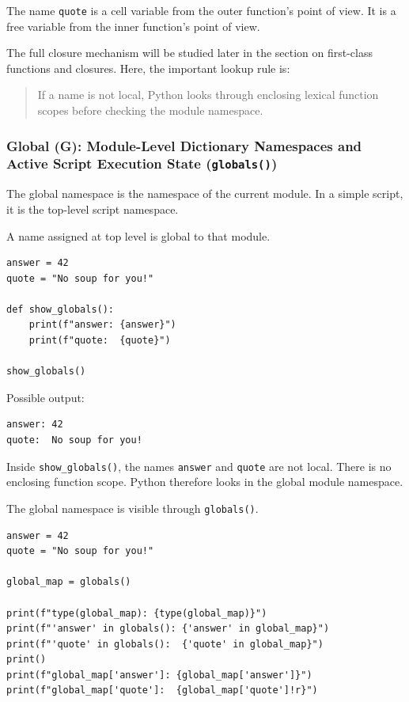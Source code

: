 The name \texttt{quote} is a cell variable from the outer function's point of view. It is a free variable from the inner function's point of view.

The full closure mechanism will be studied later in the section on first-class functions and closures. Here, the important lookup rule is:

\begin{quote}
If a name is not local, Python looks through enclosing lexical function scopes before checking the module namespace.
\end{quote}

\subsubsection{Global (G): Module-Level Dictionary Namespaces and Active Script Execution State (\texttt{globals()})}

The global namespace is the namespace of the current module. In a simple script, it is the top-level script namespace.

A name assigned at top level is global to that module.

\begin{verbatim}
answer = 42
quote = "No soup for you!"

def show_globals():
    print(f"answer: {answer}")
    print(f"quote:  {quote}")

show_globals()
\end{verbatim}

Possible output:

\begin{verbatim}
answer: 42
quote:  No soup for you!
\end{verbatim}

Inside \texttt{show\_globals()}, the names \texttt{answer} and \texttt{quote} are not local. There is no enclosing function scope. Python therefore looks in the global module namespace.

The global namespace is visible through \texttt{globals()}.

\begin{verbatim}
answer = 42
quote = "No soup for you!"

global_map = globals()

print(f"type(global_map): {type(global_map)}")
print(f"'answer' in globals(): {'answer' in global_map}")
print(f"'quote' in globals():  {'quote' in global_map}")
print()
print(f"global_map['answer']: {global_map['answer']}")
print(f"global_map['quote']:  {global_map['quote']!r}")
\end{verbatim}

